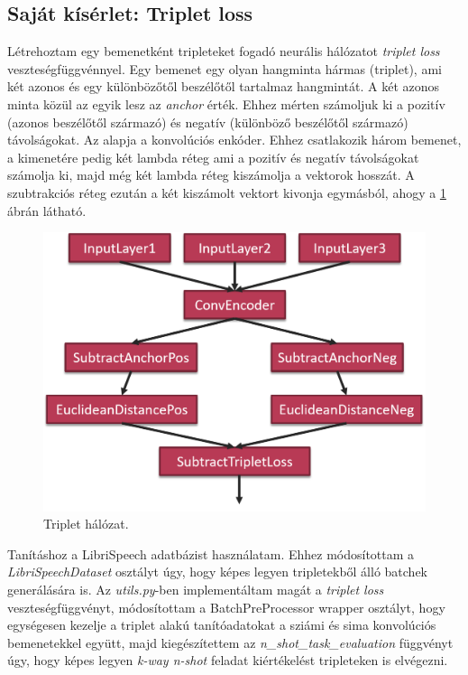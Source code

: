 \newpage

\subsection{Saját kísérlet: Triplet loss}

Létrehoztam egy bemenetként tripleteket fogadó neurális hálózatot \emph{triplet loss} veszteségfüggvénnyel. Egy bemenet egy olyan hangminta hármas (triplet), ami két azonos és egy különbözőtől beszélőtől tartalmaz hangmintát. 
\newline
\newline
A két azonos minta közül az egyik lesz az \emph{anchor} érték. Ehhez mérten számoljuk ki a pozitív (azonos beszélőtől származó) és negatív (különböző beszélőtől származó) távolságokat. 
\newline
\newline
Az alapja a konvolúciós enkóder. Ehhez csatlakozik három bemenet, a kimenetére pedig két lambda réteg ami a pozitív és negatív távolságokat számolja ki, majd még két lambda réteg kiszámolja a vektorok hosszát. A szubtrakciós réteg ezután a két kiszámolt vektort kivonja egymásból, ahogy a \ref{fig:triplet-network} ábrán látható.

\begin{figure}[!ht]
	\centering
	\includegraphics[width=120mm, keepaspectratio]{figures/triplet-network.png}
	\caption{Triplet hálózat.}
	\label{fig:triplet-network}
\end{figure}

Tanításhoz a LibriSpeech adatbázist használatam. Ehhez módosítottam a \emph{LibriSpeechDataset} osztályt úgy, hogy képes legyen tripletekből álló batchek generálására is.
\newline
\newline
Az \emph{utils.py}-ben implementáltam magát a \emph{triplet loss} veszteségfüggvényt, módosítottam a BatchPreProcessor wrapper osztályt, hogy egységesen kezelje a triplet alakú tanítóadatokat a sziámi és sima konvolúciós bemenetekkel együtt, majd kiegészítettem az \emph{n\_shot\_task\_evaluation} függvényt úgy, hogy képes legyen \emph{k-way n-shot} feladat kiértékelést tripleteken is elvégezni.


